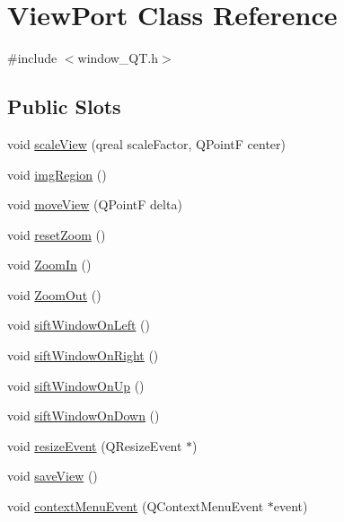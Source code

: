 \hypertarget{classViewPort}{
\section{ViewPort Class Reference}
\label{classViewPort}
}


{\ttfamily \#include $<$window\_\-QT.h$>$}

\subsection*{Public Slots}
\begin{DoxyCompactItemize}
\item 
void \hyperlink{classViewPort_af68a292bada1aadd5b3cbcd5cd86620c}{scaleView} (qreal scaleFactor, QPointF center)
\item 
void \hyperlink{classViewPort_a60f919b3f7329bb5de060fa3befda08b}{imgRegion} ()
\item 
void \hyperlink{classViewPort_a3e318f428a0d0cc2e5c3835f1c77cc06}{moveView} (QPointF delta)
\item 
void \hyperlink{classViewPort_af9e56726827ee1679b536d90586b3add}{resetZoom} ()
\item 
void \hyperlink{classViewPort_a4a67d1ac61dfdf063909b9fa5299893f}{ZoomIn} ()
\item 
void \hyperlink{classViewPort_a4f26ce0e84539f49b95aa5d43820bb85}{ZoomOut} ()
\item 
void \hyperlink{classViewPort_ab8d8fbc8a150d158840e73dc3d28d4e9}{siftWindowOnLeft} ()
\item 
void \hyperlink{classViewPort_ad75dd8cdf0fcefa9f3afb7af78ffa1fc}{siftWindowOnRight} ()
\item 
void \hyperlink{classViewPort_a539a1c2895777e89b1431146ccb26a26}{siftWindowOnUp} ()
\item 
void \hyperlink{classViewPort_aa05e98b5c021662068856f9b8f25a299}{siftWindowOnDown} ()
\item 
void \hyperlink{classViewPort_a7a1fec5745e2bd12c11f0f4a8c17183f}{resizeEvent} (QResizeEvent $\ast$)
\item 
void \hyperlink{classViewPort_a69445bb6b5b203923b6707b583cdc0d8}{saveView} ()
\item 
void \hyperlink{classViewPort_af3c98b34c5ff602bd74c5b95425de4a9}{contextMenuEvent} (QContextMenuEvent $\ast$event)
\end{DoxyCompactItemize}
